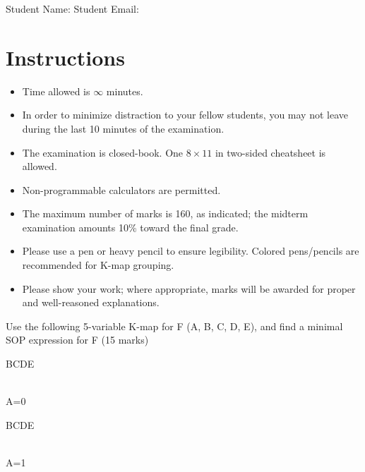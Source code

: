 \maketitle

Student Name: \hfill Student Email: \hspace{10em}
\section{Instructions}
\begin{itemize}
  \item Time allowed is $\infty$ minutes.
  \item In order to minimize distraction to your fellow students, you may not leave
  during the last 10 minutes of the examination.
  \item The examination is closed-book. One $8\times11$ in two-sided cheatsheet is allowed.
  \item Non-programmable calculators are permitted.
  \item The maximum number of marks is 160, as indicated; the midterm examination
  amounts 10\% toward the final grade.
  \item Please use a pen or heavy pencil to ensure legibility. Colored
    pens/pencils are recommended for K-map grouping.
  \item Please show your work; where appropriate, marks will be awarded for proper and well-reasoned explanations.
\end{itemize}

\begin{prob}
Use the following 5-variable K-map for F (A, B, C, D, E), and find
  a minimal SOP expression for F (15 marks)\\
\begin{minipage}{0.5\linewidth}
  \centering
  \begin{Karnaugh}{BC}{DE}
  \end{Karnaugh}\\
  A=0
\end{minipage}%
\begin{minipage}{0.5\linewidth}
  \centering
  \begin{Karnaugh}{BC}{DE}
  \end{Karnaugh}\\
  A=1
\end{minipage}
\end{prob}

